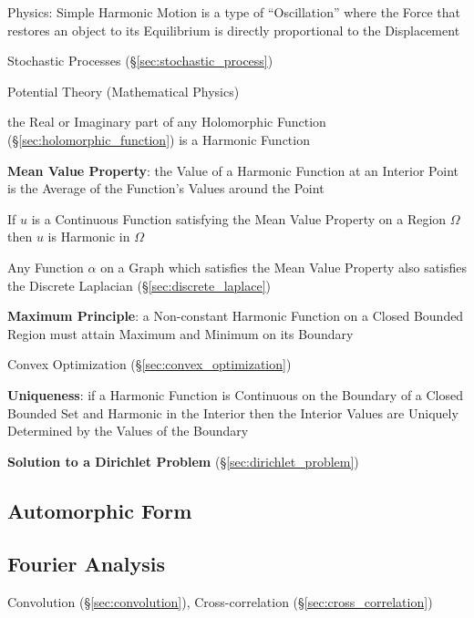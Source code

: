 Physics: Simple Harmonic Motion is a type of ``Oscillation'' where the
Force that restores an object to its Equilibrium is directly
proportional to the Displacement

Stochastic Processes (\S\ref{sec:stochastic_process})

Potential Theory (Mathematical Physics) %

the Real or Imaginary part of any Holomorphic Function
(\S\ref{sec:holomorphic_function}) is a Harmonic Function


\textbf{Mean Value Property}: the Value of a Harmonic Function at an
Interior Point is the Average of the Function's Values around the
Point

If $u$ is a Continuous Function satisfying the Mean Value Property on
a Region $\Omega$ then $u$ is Harmonic in $\Omega$

Any Function $\alpha$ on a Graph which satisfies the Mean Value
Property also satisfies the Discrete Laplacian
(\S\ref{sec:discrete_laplace})


\textbf{Maximum Principle}: a Non-constant Harmonic Function on a
Closed Bounded Region must attain Maximum and Minimum on its Boundary

Convex Optimization (\S\ref{sec:convex_optimization})


\textbf{Uniqueness}: if a Harmonic Function is Continuous on the
Boundary of a Closed Bounded Set and Harmonic in the Interior then the
Interior Values are Uniquely Determined by the Values of the Boundary


\textbf{Solution to a Dirichlet Problem}
(\S\ref{sec:dirichlet_problem})



\subsection{Automorphic Form}\label{sec:automorphic_form}

\subsection{Fourier Analysis}\label{sec:fourier_analysis}

\fist Convolution (\S\ref{sec:convolution}), Cross-correlation
(\S\ref{sec:cross_correlation})



